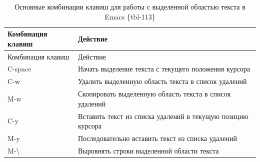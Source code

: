 \documentclass[
  english,
  russian,
  12pt,
  a4paper,
]{scrreprt}
\begin{document}
\begin{longtable}[]{@{}
  >{\raggedright\arraybackslash}p{}
  >{\raggedright\arraybackslash}p{}@{}}
\caption{Основные комбинации клавиш для работы с выделенной областью
текста в Emacs \{tbl-113\}}\tabularnewline
\toprule\noalign{}
\begin{minipage}[b]{\linewidth}\raggedright
Комбинация клавиш
\end{minipage} & \begin{minipage}[b]{\linewidth}\raggedright
Действие
\end{minipage} \\
\midrule\noalign{}
\endfirsthead
\toprule\noalign{}
\begin{minipage}[b]{\linewidth}\raggedright
Комбинация клавиш
\end{minipage} & \begin{minipage}[b]{\linewidth}\raggedright
Действие
\end{minipage} \\
\midrule\noalign{}
\endhead
\bottomrule\noalign{}
\endlastfoot
C-space & Начать выделение текста с текущего положения курсора \\
C-w & Удалить выделенную область текста в список удалений \\
M-w & Скопировать выделенную область текста в список удалений \\
C-y & Вставить текст из списка удалений в текущую позицию курсора \\
M-y & Последовательно вставить текст из списка удалений \\
M-\textbackslash{} & Выровнять строки выделенной области текста \\
\end{longtable}
\end{document}
